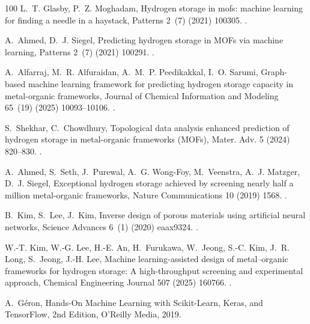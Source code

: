 \documentclass[review]{elsarticle}
\begin{document}
\begin{thebibliography}{100}
L.~T. Glasby, P.~Z. Moghadam, Hydrogen storage in mofs: machine learning for
  finding a needle in a haystack, Patterns 2~(7) (2021) 100305.
\newblock \href {https://doi.org/10.1016/j.patter.2021.100305}
  {}.

A.~Ahmed, D.~J. Siegel, Predicting hydrogen storage in {MOFs} via machine
  learning, Patterns 2~(7) (2021) 100291.
\newblock \href {https://doi.org/10.1016/j.patter.2021.100291}
  {}.

A.~Alfarraj, M.~R. Alfuraidan, A.~M.~P. Peedikakkal, I.~O. Sarumi, Graph-based
  machine learning framework for predicting hydrogen storage capacity in
  metal-organic frameworks, Journal of Chemical Information and Modeling
  65~(19) (2025) 10093--10106.
\newblock \href {https://doi.org/10.1021/acs.jcim.5c01528}
  {}.

S.~Shekhar, C.~Chowdhury, Topological data analysis enhanced prediction of
  hydrogen storage in metal-organic frameworks ({MOFs}), Mater. Adv. 5 (2024)
  820--830.
\newblock \href {https://doi.org/10.1039/D3MA00591G}
  {}.

A.~Ahmed, S.~Seth, J.~Purewal, A.~G. Wong-Foy, M.~Veenstra, A.~J. Matzger,
  D.~J. Siegel, Exceptional hydrogen storage achieved by screening nearly half
  a million metal-organic frameworks, Nature Communications 10 (2019) 1568.
\newblock \href {https://doi.org/10.1038/s41467-019-09365-w}
  {}.

B.~Kim, S.~Lee, J.~Kim, Inverse design of porous materials using artificial
  neural networks, Science Advances 6~(1) (2020) eaax9324.
\newblock \href {https://doi.org/10.1126/sciadv.aax9324}
  {}.

W.-T. Kim, W.-G. Lee, H.-E. An, H.~Furukawa, W.~Jeong, S.-C. Kim, J.~R. Long,
  S.~Jeong, J.-H. Lee, Machine learning-assisted design of metal–organic
  frameworks for hydrogen storage: A high-throughput screening and experimental
  approach, Chemical Engineering Journal 507 (2025) 160766.
\newblock \href {https://doi.org/10.1016/j.cej.2025.160766}
  {}.

A.~Géron, Hands-On Machine Learning with Scikit-Learn, Keras, and TensorFlow,
  2nd Edition, O’Reilly Media, 2019.


\end{thebibliography}
\end{document}
